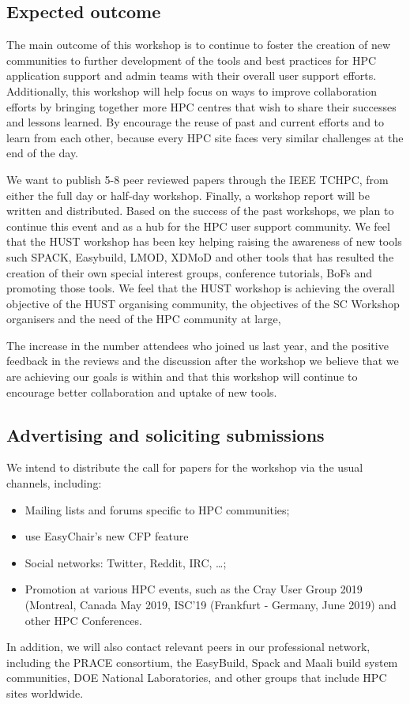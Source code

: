 \documentclass[a4paper,10pt]{article}
\begin{document}
\subsection*{Expected outcome}
\label{outcome}

The main outcome of this workshop is to continue to foster the creation of new communities
to further development of the tools and best practices for HPC application support and admin teams with 
their overall user support efforts.  Additionally, this workshop will help focus on ways to 
improve collaboration efforts by bringing together more HPC centres that wish to share their
successes and lessons learned.  By encourage the reuse of past and current efforts and to
learn from each other, because every HPC site faces very similar challenges at the end of the day.

We want to publish 5-8 peer reviewed papers through the IEEE TCHPC,
from either the full day or half-day workshop.  
Finally, a workshop report will be written and distributed. Based on the success of the
past workshops, we plan to continue this event and as a hub for the HPC 
user support community. We feel that the HUST workshop has been key helping raising 
the awareness of new tools such SPACK, Easybuild, LMOD, XDMoD and other tools that has resulted 
the creation of their own special interest groups, conference tutorials, BoFs and promoting those tools.  
We feel that the HUST workshop is achieving the overall objective of the HUST organising community, the 
objectives of the SC Workshop organisers and the need of the HPC community at large, 

The increase in the number attendees who joined us last year,
and the positive feedback in the reviews and the discussion after the workshop we believe
that we are achieving our goals is within and that this workshop will continue to encourage 
better collaboration and uptake of new tools. 

\subsection*{Advertising and soliciting submissions}
\label{advertising}

We intend to distribute the call for papers for the workshop via the usual channels, including:

\begin{itemize}
    \item Mailing lists and forums specific to HPC communities;
    \item use EasyChair's new CFP feature
    \item Social networks: Twitter, Reddit, IRC, \ldots;
    \item Promotion at various HPC events, such as the Cray User Group 2019 (Montreal, Canada May 2019, ISC'19 (Frankfurt - Germany, June 2019) and other HPC Conferences.
\end{itemize}
\noindent
In addition, we will also contact relevant peers in our professional network, including the PRACE consortium, the EasyBuild, Spack and Maali build system communities, DOE National Laboratories, and other groups that include HPC sites worldwide.
\end{document}
